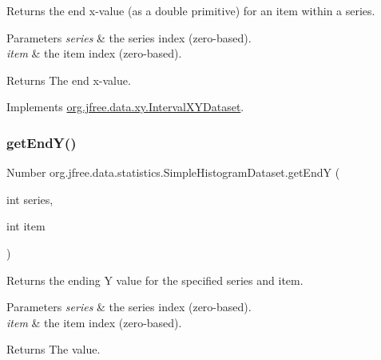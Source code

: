 Returns the end x-\/value (as a double primitive) for an item within a series.


\begin{DoxyParams}{Parameters}
{\em series} & the series index (zero-\/based). \\
\hline
{\em item} & the item index (zero-\/based).\\
\hline
\end{DoxyParams}
\begin{DoxyReturn}{Returns}
The end x-\/value. 
\end{DoxyReturn}


Implements \mbox{\hyperlink{interfaceorg_1_1jfree_1_1data_1_1xy_1_1_interval_x_y_dataset_ad976e66caa1fc4d72a599f2c26c55dcc}{org.\+jfree.\+data.\+xy.\+Interval\+X\+Y\+Dataset}}.

\mbox{\label{classorg_1_1jfree_1_1data_1_1statistics_1_1_simple_histogram_dataset_ae046f2a1b89f4a3cf42ffd21e8b0ed0f}} 
\subsubsection{\texorpdfstring{get\+End\+Y()}{getEndY()}}
{\footnotesize\ttfamily Number org.\+jfree.\+data.\+statistics.\+Simple\+Histogram\+Dataset.\+get\+EndY (\begin{DoxyParamCaption}\item[{int}]{series,  }\item[{int}]{item }\end{DoxyParamCaption})}

Returns the ending Y value for the specified series and item.


\begin{DoxyParams}{Parameters}
{\em series} & the series index (zero-\/based). \\
\hline
{\em item} & the item index (zero-\/based).\\
\hline
\end{DoxyParams}
\begin{DoxyReturn}{Returns}
The value. 
\end{DoxyReturn}


